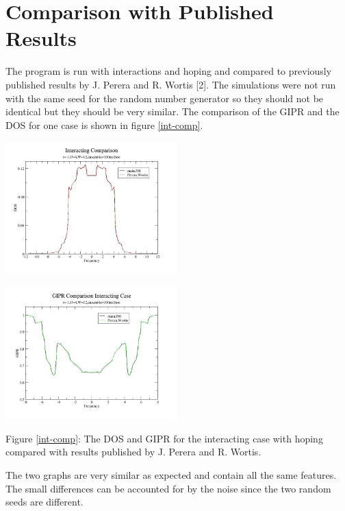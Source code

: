 \documentclass{article}
\begin{document}
\section{Comparison with Published Results}
The program is run with interactions and hoping and compared to previously published results by J. Perera and R. Wortis [2]. The simulations were not run with the same seed for the random number generator so they should not be identical but they should be very similar. The comparison of the GIPR and the DOS for one case is shown in figure \ref{int-comp}.
\begin{multicols}{2}
\begin{center}
	\includegraphics[width=250px]{dos_compareu4.jpg} \\ \label{int-comp}
\end{center}
\begin{center}
	\includegraphics[width=250px]{gipr_compareu4.jpg} \\
\end{center}
\end{multicols}
\begin{center}
Figure \ref{int-comp}: The DOS and GIPR for the interacting case with hoping compared with results published by J. Perera and R. Wortis.
\end{center}
The two graphs are very similar as expected and contain all the same features. The small differences can be accounted for by the noise since the two random seeds are different.
\end{document}
